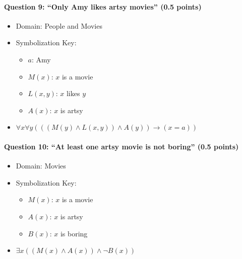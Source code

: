 \documentclass[letterpaper,11pt]{article}
\theoremstyle{mytheor}
\begin{document}
\paragraph{Question 9: ``Only Amy likes artsy movies'' (0.5 points)}
\phantom{a}
\begin{framed}
    \begin{itemize}
        \item Domain: People and Movies
        \item Symbolization Key:
        \begin{itemize}
            \item $a$: Amy
            \item $M(x)$: $x$ is a movie
            \item $L(x,y)$: $x$ likes $y$
            \item $A(x)$: $x$ is artsy
        \end{itemize}
        \item $\forall x \forall y \left( \left( \left(M(y) \land L(x, y)\right) \land A(y) \right) \rightarrow (x = a)\right)$
    \end{itemize}
\end{framed}

\paragraph{Question 10: ``At least one artsy movie is not boring'' (0.5 points)}
\phantom{a}
\begin{framed}
    \begin{itemize}
        \item Domain: Movies
        \item Symbolization Key:
        \begin{itemize}
            \item $M(x)$: $x$ is a movie
            \item $A(x)$: $x$ is artsy
            \item $B(x)$: $x$ is boring
        \end{itemize}
        \item $\exists x \left( \left(M(x) \land A(x) \right) \land \neg B(x)\right)$
    \end{itemize}
\end{framed}
\end{document}
